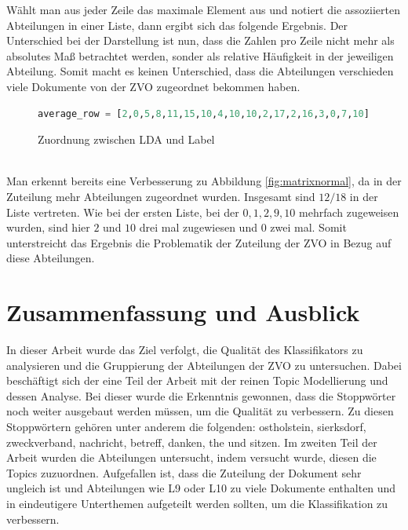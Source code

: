 \documentclass[german,version-2020-11]{uzl-thesis}
\begin{document}
\begin{itemize}
\begin{enumerate}
Wählt man aus jeder Zeile das maximale Element aus und notiert die assoziierten Abteilungen in einer Liste, dann ergibt sich das folgende Ergebnis. Der Unterschied bei der Darstellung ist nun, dass die Zahlen pro Zeile nicht mehr als absolutes Maß betrachtet werden, sonder als relative Häufigkeit in der jeweiligen Abteilung. Somit macht es keinen Unterschied, dass die Abteilungen verschieden viele Dokumente von der ZVO zugeordnet bekommen haben. \\

\begin{figure}[h]
\begin{center}
\begin{lstlisting}[language=Python]
average_row = [2,0,5,8,11,15,10,4,10,10,2,17,2,16,3,0,7,10]
\end{lstlisting}
\caption{Zuordnung zwischen LDA und Label} 
\end{center}
\end{figure}\\

Man erkennt bereits eine Verbesserung zu Abbildung \ref{fig:matrixnormal}, da in der Zuteilung mehr Abteilungen zugeordnet wurden. Insgesamt sind $12/18$ in der Liste vertreten. Wie bei der ersten Liste, bei der  $ 0,1,2,9,10 $ mehrfach zugeweisen wurden, sind hier $2$ und $10$ drei mal zugewiesen und $0$ zwei mal. Somit unterstreicht das Ergebnis die Problematik der Zuteilung der ZVO in Bezug auf diese Abteilungen. 

\end{enumerate}


\chapter{Zusammenfassung und Ausblick}%

In dieser Arbeit wurde das Ziel verfolgt, die Qualität des Klassifikators zu analysieren und die Gruppierung der Abteilungen der ZVO zu untersuchen. Dabei beschäftigt sich der eine Teil der Arbeit mit der reinen Topic Modellierung und dessen Analyse. 
Bei dieser wurde die Erkenntnis gewonnen, dass die Stoppwörter noch weiter ausgebaut werden müssen, um die Qualität zu verbessern. Zu diesen Stoppwörtern gehören unter anderem die folgenden: ostholstein, sierksdorf, zweckverband, nachricht, betreff, danken, the und sitzen. 
Im zweiten Teil der Arbeit wurden die Abteilungen untersucht, indem versucht wurde, diesen die Topics zuzuordnen. Aufgefallen ist, dass die Zuteilung der Dokument sehr ungleich ist und Abteilungen wie L9 oder L10 zu viele Dokumente enthalten und in eindeutigere Unterthemen aufgeteilt werden sollten, um die Klassifikation zu verbessern. 




\end{itemize}
\end{document}
